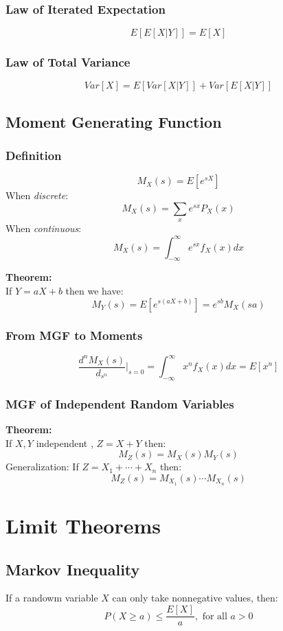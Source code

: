 \documentclass[11pt]{article}
\begin{document}
\subsubsection{Law of Iterated Expectation}
$$E[E[X|Y]] = E[X]$$
\subsubsection{Law of Total Variance}
$$Var[X] = E[Var[X|Y]] + Var[E[X|Y]]$$

\subsection{Moment Generating Function}
\subsubsection{Definition}
$$M_X(s) = E[e^{sX}]$$
\indent \indent When \emph{discrete}:\\
$$M_X(s) = \sum_x e^{sx} P_X(x)$$
\indent \indent When \emph{continuous}:\\
$$M_X(s) = \int_{-\infty}^{\infty} e^{sx}f_X(x)dx$$

\noindent \textbf{Theorem:}\\
If $Y=aX+b$ then we have:\\
$$M_Y(s) = E[e^{s(aX+b)}] = e^{sb}M_X(sa)$$

\subsubsection{From MGF to Moments}
$$\frac{d^n M_X(s)}{d_{s^n}} \bigg|_{s=0} = \int_{-\infty}^{\infty} x^n f_X(x)dx = E[x^n]$$

\subsubsection{MGF of Independent Random Variables}
\noindent \textbf{Theorem:}\\
\indent If $X, Y$ independent , $Z=X+Y$ then:\\
$$M_Z(s) = M_X(s)M_Y(s)$$
\indent Generalization: If $Z=X_1+\cdots +X_n$ then:\\
$$M_Z(s) = M_{X_1}(s)\cdots M_{X_n}(s)$$

\section{Limit Theorems}
\subsection{Markov Inequality}
If a randowm variable $X$ can only take nonnegative values, then:\\
$$P(X\geq a) \leq \frac{E[X]}{a}, \text{\ for all } a>0$$
\end{document}
